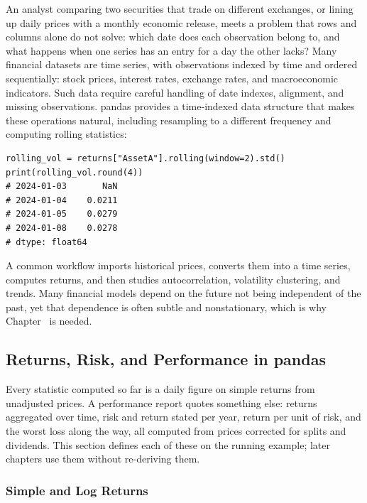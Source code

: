 \documentclass[../ai_in_finance]{subfiles}
\begin{document}
An analyst comparing two securities that trade on different exchanges, or lining up daily prices with a monthly economic release, meets a problem that rows and columns alone do not solve: which date does each observation belong to, and what happens when one series has an entry for a day the other lacks? Many financial datasets are time series, with observations indexed by time and ordered sequentially: stock prices, interest rates, exchange rates, and macroeconomic indicators. Such data require careful handling of date indexes, alignment, and missing observations. pandas provides a time-indexed data structure that makes these operations natural, including resampling to a different frequency and computing rolling statistics:

\begin{verbatim}
rolling_vol = returns["AssetA"].rolling(window=2).std()
print(rolling_vol.round(4))
# 2024-01-03       NaN
# 2024-01-04    0.0211
# 2024-01-05    0.0279
# 2024-01-08    0.0278
# dtype: float64
\end{verbatim}

A common workflow imports historical prices, converts them into a time series, computes returns, and then studies autocorrelation, volatility clustering, and trends. Many financial models depend on the future not being independent of the past, yet that dependence is often subtle and nonstationary, which is why Chapter~ is needed.

\subsection{Returns, Risk, and Performance in pandas}
\label{sec:python-returns-risk}

Every statistic computed so far is a daily figure on simple returns from unadjusted prices. A performance report quotes something else: returns aggregated over time, risk and return stated per year, return per unit of risk, and the worst loss along the way, all computed from prices corrected for splits and dividends. This section defines each of these on the running example; later chapters use them without re-deriving them.

\subsubsection*{Simple and Log Returns}
\end{document}
